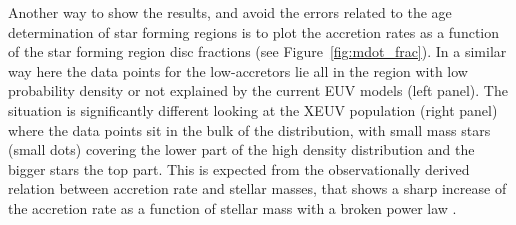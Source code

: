 \documentclass[fleqn,usenatbib,letters]{mnras}
\begin{document}
Another way to show the results, and avoid the errors related to the age determination of star forming regions is to plot the accretion rates as a function of the star forming region disc fractions (see Figure~\ref{fig:mdot_frac}). In a similar way here the data points for the low-accretors lie all in the region with low probability density or not explained by the current EUV models (left panel). The situation is significantly different looking at the XEUV population (right panel) where the data points sit in the bulk of the distribution, with small mass stars (small dots) covering the lower part of the high density distribution and the bigger stars the top part. This is expected from the observationally derived relation between accretion rate and stellar masses, that shows a sharp increase of the accretion rate as a function of stellar mass with a broken power law \citep{Alcala2017}.
\end{document}

